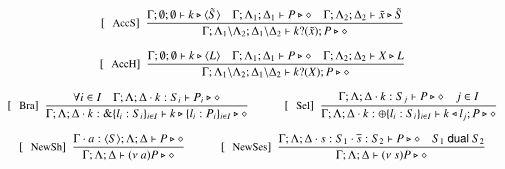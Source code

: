 \begin{figure}[!t]
\[\begin{array}{c}
		\trule{AccS}~~\tree{
			\Gamma; \emptyset; \emptyset \proves k \hastype \chtype{\tilde{S}}
			\quad
			\Gamma; \Lambda_1; \Delta_1 \proves P \hastype \Proc
			\quad
			\Gamma; \Lambda_2; \Delta_2 \proves \tilde{x} \hastype \tilde{S}
		}{
			\Gamma; \Lambda_1 \backslash \Lambda_2; \Delta_1 \backslash \Delta_2 \proves \binp{k}{\tilde{x}} P \hastype \Proc
		}
		\\[6mm]

		\trule{AccH}~~\tree{
			\Gamma; \emptyset; \emptyset \proves k \hastype \chtype{L}
			\quad
			\Gamma; \Lambda_1; \Delta_1 \proves P \hastype \Proc
			\quad
			\Gamma; \Lambda_2; \Delta_2 \proves X \hastype L
		}{
			\Gamma; \Lambda_1 \backslash \Lambda_2; \Delta_1 \backslash \Delta_2 \proves \binp{k}{X} P \hastype \Proc
		}
		\\[6mm]

		\trule{Bra}~~\tree{
			 \forall i \in I \quad \Gamma; \Lambda; \Delta \cat k:S_i \proves P_i \hastype \Proc
		}{
			\Gamma; \Lambda; \Delta \cat k: \btbra{l_i:S_i}_{i \in I} \proves \bbra{k}{l_i:P_i}_{i \in I}\hastype \Proc
		}
		\qquad\quad 
	 	\trule{Sel}~~\tree{
			\Gamma; \Lambda; \Delta \cat k: S_j  \proves P \hastype \Proc \quad j \in I
		}{
			\Gamma; \Lambda; \Delta \cat k:\btsel{l_i:S_i}_{i \in I} \proves \bsel{k}{l_j} P \hastype \Proc
		}
		\\[6mm]

%

		\trule{NewSh}~~\tree{
			\Gamma\cat a:\chtype{S} ; \Lambda; \Delta \proves P \hastype \Proc
		}{
			\Gamma; \Lambda; \Delta \proves \news{a} P \hastype \Proc}
		\qquad\quad
		\trule{NewSes}~~\tree{
			\Gamma; \Lambda; \Delta \cat s:S_1 \cat \dual{s}: S_2 \proves P \hastype \Proc \quad S_1 \dualof S_2
		}{
			\Gamma; \Lambda; \Delta \proves \news{s} P \hastype \Proc
		}
		\\[6mm]


\end{array}\]
\end{figure}
